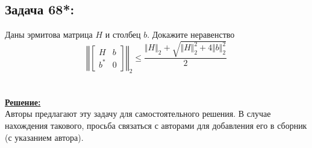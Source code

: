 \documentclass[a4paper,12pt,titlepage,final]{article}
\begin{document}
\subsection*{Задача 68*:}
\noindent Даны эрмитова матрица $H$ и столбец $b$. Докажите неравенство
$$ \left\Vert \begin{bmatrix} H & b \\ b^* & 0 \end{bmatrix}\right\Vert_2 \leq \frac{\Vert H \Vert_2 + \sqrt{\Vert H \Vert_2^2 + 4 \Vert b \Vert_2^2}}{2}$$ \\ \\
\textbf{\underline{Решение:}} \\
Авторы предлагают эту задачу для самостоятельного решения. В случае нахождения такового, просьба связаться с авторами для добавления его в сборник (с указанием автора).
\end{document}
